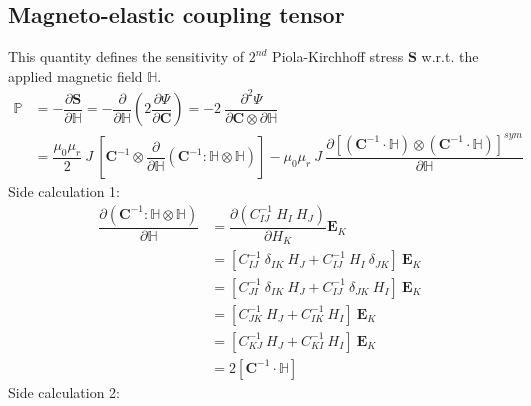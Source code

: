 \documentclass[11pt,a4paper,final]{article}
\begin{document}
\subsection{Magneto-elastic coupling tensor}
This quantity defines the sensitivity of $2^{nd}$ Piola-Kirchhoff stress $\mathbf{S}$ w.r.t. the applied magnetic field $\mathbb{H}$.
\begin{align*}
\mathbb{P} &= -\dfrac{\partial \mathbf{S}}{\partial \mathbb{H}} = -\dfrac{\partial}{\partial \mathbb{H}} \left( 2 \dfrac{\partial \Psi}{\partial \mathbf{C}} \right) = -2 \ \dfrac{\partial^2 \Psi}{\partial \mathbf{C} \otimes \partial \mathbb{H}}\\
&= \dfrac{\mu_0 \mu_r}{2} \ J \ \left[ \mathbf{C}^{-1} \otimes \dfrac{\partial}{\partial \mathbb{H}} \left( \mathbf{C}^{-1} : \mathbb{H} \otimes \mathbb{H} \right) \right] - \mu_0 \mu_r \ J \ \dfrac{\partial [ (\mathbf{C}^{-1} \cdot \mathbb{H}) \otimes (\mathbf{C}^{-1} \cdot \mathbb{H}) ]^{sym}}{\partial \mathbb{H}}
\end{align*}
Side calculation 1:
\begin{align*}
\dfrac{\partial \left( \mathbf{C}^{-1} : \mathbb{H} \otimes \mathbb{H} \right)}{\partial \mathbb{H}} &= \dfrac{\partial \left( C^{-1}_{IJ} \ H_I \ H_J \right)}{\partial H_K} \mathbf{E}_K \\
&= \left[ C^{-1}_{IJ} \ \delta_{IK} \ H_J + C^{-1}_{IJ} \ H_I \ \delta_{JK} \right] \ \mathbf{E}_K \\
&= \left[ C^{-1}_{JI} \ \delta_{IK} \ H_J + C^{-1}_{IJ} \ \delta_{JK} \ H_I \right] \ \mathbf{E}_K \\
&= \left[ C^{-1}_{JK} \ H_J + C^{-1}_{IK} \ H_I \right] \ \mathbf{E}_K \\
&= \left[ C^{-1}_{KJ} \ H_J + C^{-1}_{KI} \ H_I \right] \ \mathbf{E}_K \\
&= 2 [\mathbf{C}^{-1} \cdot \mathbb{H}]
\end{align*}
Side calculation 2:
\end{document}
